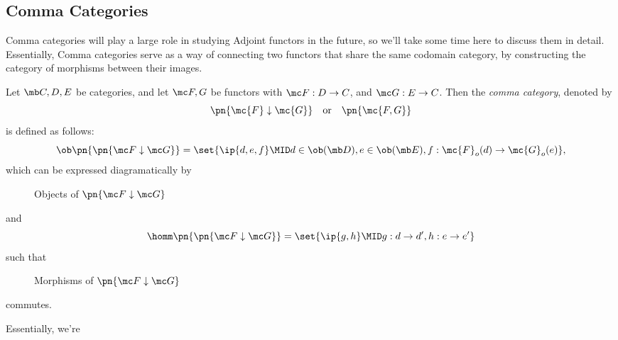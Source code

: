 \documentclass[nocover]{pset}
\begin{document}
\begin{adjustwidth}{1em}{1em}
  \section{Comma Categories}
  Comma categories will play a large role in studying Adjoint functors
  in the future, so we'll take some time here to discuss them in
  detail. Essentially, Comma categories serve as a way of connecting
  two functors that share the same codomain category, by constructing
  the category of morphisms between their images.
  \begin{definition}
    Let $\mb C,D,E$ be categories, and let $\mc F,G$ be functors with
    $\mc F : D \to C$, and $\mc G : E \to C$. Then the \emph{comma
      category}, denoted by
    \[
      \pn{\mc{F} \downarrow \mc{G}} \quad \text{or} \quad \pn{\mc{F, G}}
    \]
    is defined as follows:
    \[
      \ob\pn{\pn{\mc F \downarrow \mc G}} = \set{\ip{d,e,f} \MID d \in
        \ob(\mb D), e \in \ob(\mb E), f : \mc{F}_o(d) \to
        \mc{G}_o(e)},
    \]
    which can be expressed diagramatically by
    \begin{figure}[H]
      \centering
      \caption{Objects of $\pn{\mc F \downarrow \mc G}$}
    \end{figure}
    and
    \[
      \homm\pn{\pn{\mc F \downarrow \mc G}} = \set{\ip{g,h} \MID g : d
      \to d', h : e \to e'}
    \]
    such that
    \begin{figure}[H]
      \centering
      \caption{Morphisms of $\pn{\mc F \downarrow \mc G}$}
    \end{figure}
    commutes.
  \end{definition}
  Essentially, we're
\end{adjustwidth}
\end{document}
